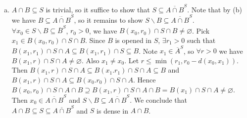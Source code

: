 \documentclass[A4paper,12pt]{article}
\theoremstyle{definition}
\numberwithin{equation}{section}
\begin{document}
\begin{enumerate}[(1)]
\begin{enumerate}[(a)]
                \item
                    $A \cap B \subseteq S$ is trivial, so it suffice to show that $S \subseteq \overline{A\cap B}^S$. 
                    Note that by (b) we  have $B \subseteq \overline{A \cap B}^S$, so it remains to show $S\backslash B \subseteq \overline{A\cap B}^S$.
                    $\forall x_0 \in S\backslash B \subseteq \overline{B}^S$, $r_0 > 0$, we have $B(x_0, r_0) \cap S \cap B \neq \varnothing$.
                    Pick $x_1 \in B(x_0, r_0) \cap S \cap B$. 
                    Since $B$ is opened in $S$, $\exists r_1 > 0$ such that $B(x_1, r_1) \cap S \cap A \subseteq B(x_1, r_1) \cap S \subseteq B$.
                    Note $x_1 \in \overline{A}^S$, so $\forall r>0$ we have $B(x_1, r) \cap S \cap A \neq \varnothing$. Also $x_1 \neq x_0$.
                    Let $r \le \min(r_1, r_0-d(x_0, x_1)) $. Then $B(x_1, r) \cap S \cap A \subseteq B(x_1. r_1) \cap S \cap A \subseteq B$ and $B(x_1, r) \cap S \cap A \subseteq B(x_0. r_0) \cap S \cap A$.
                    Hence $B(x_0, r_0) \cap S \cap A \cap B \supseteq B(x_1, r)  \cap S \cap A \cap B = B(x_1) \cap S \cap A \neq \varnothing$.
                    Then $x_0 \in \overline{A\cap B}^S$ and $S\backslash B \subseteq \overline{A\cap B}^S$.
                    We conclude that $A\cap B \subseteq S \subseteq \overline{A\cap B}^S$ and $S$ is dense in $A\cap B$.

            \end{enumerate}
\end{enumerate}
\end{document}
